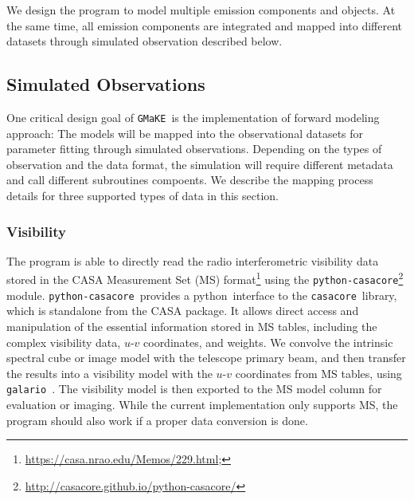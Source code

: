 \documentclass[twocolumn,tighten]{aastex62}
\newcommand{\python}{{\sc python}}
\newcommand{\gmake}{{\tt GMaKE}}
\newcommand{\galario}{{\tt galario}}
\newcommand{\pycasacore}{{\tt python-casacore}}
\newcommand{\casacore}{{\tt casacore}}
\begin{document}
We design the program to model multiple emission components and objects. At the same time, all emission components are integrated and mapped into different datasets through simulated observation described below.

\subsection{Simulated Observations}

One critical design goal of \gmake\ is the implementation of forward modeling approach:
The models will be mapped into the observational datasets for parameter fitting through simulated observations.
Depending on the types of observation and the data format, the simulation will require different metadata and call different subroutines compoents. 
We describe the mapping process details for three supported types of data in this section.

\subsubsection{Visibility}

The program is able to directly read the radio interferometric visibility data stored in the CASA Measurement Set (MS) format\footnote{\url{https://casa.nrao.edu/Memos/229.html};\cite{van-Diepen:2015aa}} using the \pycasacore\footnote{\url{http://casacore.github.io/python-casacore/}} module.
\pycasacore\ provides a \python\ interface to the \casacore\ library, which is standalone from the CASA package. 
 It allows direct access and manipulation of the essential information stored in MS tables, including the complex visibility data, $u$-$v$ coordinates, and weights.
We convolve the intrinsic spectral cube or image model with the telescope primary beam, and then transfer the results into a visibility model with the $u$-$v$ coordinates from MS tables, using \galario\ \citep{Tazzari:2018aa}.
The visibility model is then exported to the MS model column for evaluation or imaging.
While the current implementation only supports MS, the program should also work if a proper data conversion is done.
\end{document}
